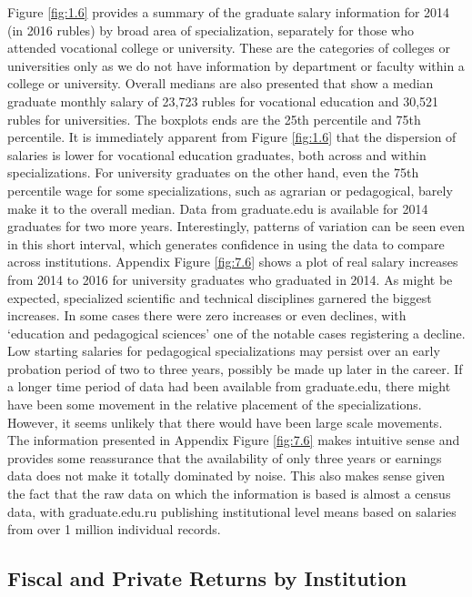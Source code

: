 \documentclass[alpha-refs]{wiley-article-05g}
\begin{document}
Figure \ref{fig:1.6} provides a summary of the graduate salary information 
for 2014 (in 2016 rubles) by broad area of specialization, separately for 
those who attended vocational college or university. These are the 
categories of colleges or universities only as we do not have information 
by department or faculty within a college or university. Overall medians 
are also presented that show a median graduate monthly salary of 23,723 
rubles for vocational education and 30,521 rubles for universities. The 
boxplots 
ends are the 25th percentile and 75th percentile. It is immediately 
apparent from Figure \ref{fig:1.6} that the dispersion of salaries is lower 
for vocational education graduates, both across and within specializations. 
For university graduates on the other hand, even the 75th percentile wage 
for some specializations, such as agrarian or pedagogical, barely make it 
to the overall median. Data from graduate.edu is available for 2014 
graduates for two more years. Interestingly, patterns of variation can be 
seen even in this short interval, which generates confidence in using the 
data to compare across institutions. Appendix Figure \ref{fig:7.6} shows a 
plot of real salary increases from 2014 to 2016 for university graduates 
who graduated in 2014. As might be expected, specialized scientific and 
technical disciplines garnered the biggest increases.  In some cases there 
were zero increases or even declines, with `education and pedagogical 
sciences' one of the notable cases registering a decline. Low starting 
salaries for pedagogical specializations may persist over an early 
probation period of two to three years, possibly be made up later in the 
career. If a longer time period of data had been available from 
graduate.edu, there might have been some movement in the relative placement 
of the specializations.  However, it seems unlikely that there would have 
been large scale movements. The information presented in Appendix Figure 
\ref{fig:7.6} makes intuitive sense and provides some reassurance that the 
availability of only three years or earnings data does not make it totally 
dominated by noise. This also makes sense given the fact that the raw data 
on which the information is based is almost a census data, with 
graduate.edu.ru publishing institutional level means based on salaries from 
over 1 million individual records. 

\vspace{-2em}

\subsection{Fiscal and Private Returns by Institution}
\end{document}
